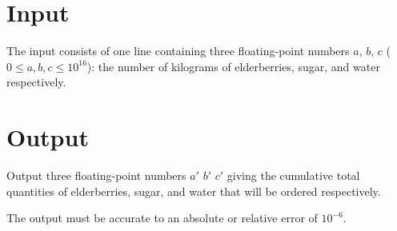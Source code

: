 \section*{Input}

The input consists of one line containing three floating-point numbers $a$, $b$,
$c$ ($0 \le a, b, c \le 10^{16}$): the number of kilograms of elderberries, sugar,
and water respectively.
  
\section*{Output}

Output three floating-point numbers $a'$ $b'$ $c'$ giving the cumulative total
quantities of elderberries, sugar, and water that will be ordered respectively.

The output must be accurate to an absolute or relative error of $10^{-6}$.
